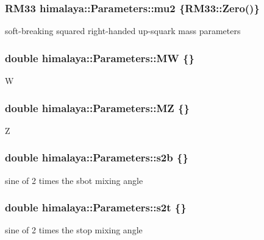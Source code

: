 \subsubsection[{\texorpdfstring{mu2}{mu2}}]{\setlength{\rightskip}{0pt plus 5cm}R\+M33 himalaya\+::\+Parameters\+::mu2 \{R\+M33\+::\+Zero()\}}\hypertarget{structhimalaya_1_1Parameters_a2b2c94041a50cae06d1488dd403fec07}{}\label{structhimalaya_1_1Parameters_a2b2c94041a50cae06d1488dd403fec07}
soft-\/breaking squared right-\/handed up-\/squark mass parameters 
\subsubsection[{\texorpdfstring{MW}{MW}}]{\setlength{\rightskip}{0pt plus 5cm}double himalaya\+::\+Parameters\+::\+MW \{\}}\hypertarget{structhimalaya_1_1Parameters_a901124ec812d32656ed0a1cc7b3ae07c}{}\label{structhimalaya_1_1Parameters_a901124ec812d32656ed0a1cc7b3ae07c}
W 
\subsubsection[{\texorpdfstring{MZ}{MZ}}]{\setlength{\rightskip}{0pt plus 5cm}double himalaya\+::\+Parameters\+::\+MZ \{\}}\hypertarget{structhimalaya_1_1Parameters_adab7c0a5e2ea82e8a6ce209e424e3254}{}\label{structhimalaya_1_1Parameters_adab7c0a5e2ea82e8a6ce209e424e3254}
Z 
\subsubsection[{\texorpdfstring{s2b}{s2b}}]{\setlength{\rightskip}{0pt plus 5cm}double himalaya\+::\+Parameters\+::s2b \{\}}\hypertarget{structhimalaya_1_1Parameters_ae6574cf2bb33e968f3285167941cd696}{}\label{structhimalaya_1_1Parameters_ae6574cf2bb33e968f3285167941cd696}
sine of 2 times the sbot mixing angle 
\subsubsection[{\texorpdfstring{s2t}{s2t}}]{\setlength{\rightskip}{0pt plus 5cm}double himalaya\+::\+Parameters\+::s2t \{\}}\hypertarget{structhimalaya_1_1Parameters_a0f85389598077341d20683c371a8d1be}{}\label{structhimalaya_1_1Parameters_a0f85389598077341d20683c371a8d1be}
sine of 2 times the stop mixing angle 
